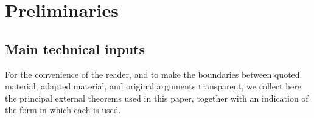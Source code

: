 \documentclass[a4paper,11pt,reqno]{amsart}
\numberwithin{equation}{section}
\theoremstyle{plain} %
\theoremstyle{definition} %
\theoremstyle{remark}
\begin{document}

\section{Preliminaries}\label{sec:preliminaries}

\subsection{Main technical inputs}\label{subsec:main-technical-inputs}

For the convenience of the reader, and to make the boundaries between
quoted material, adapted material, and original arguments transparent, we
collect here the principal external theorems used in this paper, together
with an indication of the form in which each is used.
\end{document}

